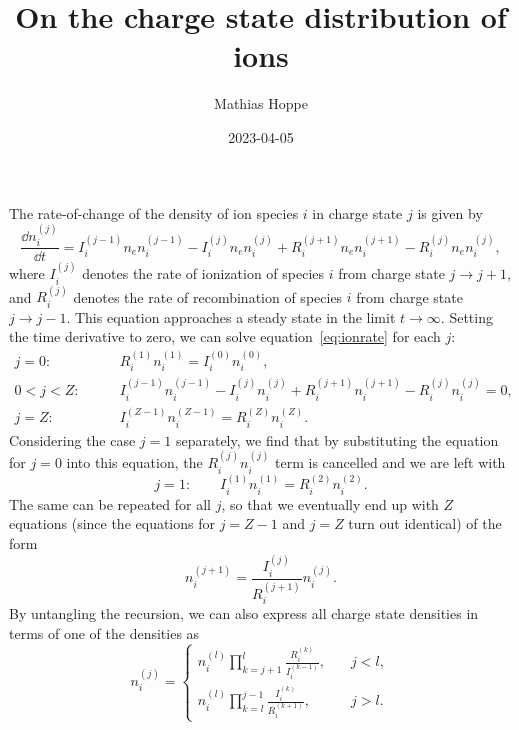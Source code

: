 \documentclass{notes}
\author{Mathias Hoppe}
\title{On the charge state distribution of ions}
\date{2023-04-05}
\begin{document}
	\maketitle

	The rate-of-change of the density of ion species $i$ in charge state $j$ is
	given by
	\begin{equation}\label{eq:ionrate}
		\frac{\dd n_i^{(j)}}{\dd t} =
			I_i^{(j-1)}n_en_i^{(j-1)} -
			I_i^{(j)}n_en_i^{(j)} +
			R_i^{(j+1)}n_en_i^{(j+1)} -
			R_i^{(j)}n_en_i^{(j)},
	\end{equation}
	where $I_i^{(j)}$ denotes the rate of ionization of species $i$ from charge
	state $j\to j+1$, and $R_i^{(j)}$ denotes the rate of recombination of
	species $i$ from charge state $j\to j-1$. This equation approaches a steady
	state in the limit $t\to\infty$. Setting the time derivative to zero, we can
	solve equation~\eqref{eq:ionrate} for each $j$:
	\begin{equation}\label{eq:sbs}
		\begin{aligned}
			j=0:\qquad & R_i^{(1)}n_i^{(1)} = I_i^{(0)}n_i^{(0)},\\
			0<j<Z:\qquad & I_i^{(j-1)}n_i^{(j-1)} - I_i^{(j)}n_i^{(j)} +
				R_i^{(j+1)}n_i^{(j+1)} - R_i^{(j)}n_i^{(j)} = 0,\\
			j=Z:\qquad & I_i^{(Z-1)}n_i^{(Z-1)} = R_i^{(Z)}n_i^{(Z)}.
		\end{aligned}
	\end{equation}
	Considering the case $j=1$ separately, we find that by substituting the
	equation for $j=0$ into this equation, the $R_i^{(j)}n_i^{(j)}$ term is
	cancelled and we are left with
	\begin{equation}
		j=1:\qquad I_i^{(1)}n_i^{(1)} = R_i^{(2)}n_i^{(2)}.
	\end{equation}
	The same can be repeated for all $j$, so that we eventually end up with
	$Z$ equations (since the equations for $j=Z-1$ and $j=Z$ turn out identical)
	of the form
	\begin{equation}\label{eq:ni}
		n_i^{(j+1)} =
		\frac{I_i^{(j)}}{R_i^{(j+1)}}n_i^{(j)}.
	\end{equation}
	By untangling the recursion, we can also express all charge state densities
	in terms of one of the densities as
	\begin{equation}
		n_i^{(j)} =
		\begin{cases}
			n_i^{(l)}\prod_{k=j+1}^l
				\frac{R_i^{(k)}}{I_i^{(k-1)}},
				&\quad j < l,\\
			n_i^{(l)}\prod_{k=l}^{j-1}
				\frac{I_i^{(k)}}{R_i^{(k+1)}},
				&\quad j > l.
		\end{cases}
	\end{equation}
\end{document}

